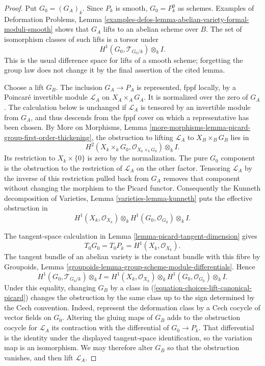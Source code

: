 \begin{proof}
Put $G_0 = (G_A)_k$. Since $P_k$ is smooth, $G_0=P_k^0$ as schemes. Examples
of Deformation Problems, Lemma
\ref{examples-defos-lemma-abelian-variety-formal-moduli-smooth} shows that
$G_A$ lifts to an abelian scheme over $B$. The set of isomorphism classes of
such lifts is a torsor under
\begin{equation}
\label{equation-choices-lift-canonical-picard}
H^1(G_0, \mathcal{T}_{G_0/k}) \otimes_k I.
\end{equation}
This is the usual difference space for lifts of a smooth scheme; forgetting
the group law does not change it by the final assertion of the cited lemma.

Choose a lift $G_B$. The inclusion $G_A \to P_A$ is represented, fppf locally,
by a Poincar\'e invertible module $\mathcal{L}_A$ on $X_A \times_A G_A$.
It is normalized over the zero of $G_A$. The calculation below is unchanged
if $\mathcal{L}_A$ is tensored by an invertible module from $G_A$, and thus
descends from the fppf cover on which a representative has been chosen. By
More on Morphisms, Lemma
\ref{more-morphisms-lemma-picard-group-first-order-thickening}, the obstruction
to lifting $\mathcal{L}_A$ to $X_B \times_B G_B$ lies in
$$
H^2(X_k \times_k G_0, \mathcal{O}_{X_k \times_k G_0}) \otimes_k I.
$$
Its restriction to $X_k \times \{0\}$ is zero by the normalization. The pure
$G_0$ component is the obstruction to the restriction of $\mathcal{L}_A$ on
the other factor. Tensoring $\mathcal{L}_A$ by the inverse of this restriction
pulled back from $G_A$ removes that component without changing the morphism to
the Picard functor. Consequently the Kunneth decomposition of Varieties, Lemma
\ref{varieties-lemma-kunneth} puts the effective obstruction in
\begin{equation}
\label{equation-obstruction-lift-poincare}
H^1(X_k, \mathcal{O}_{X_k}) \otimes_k
H^1(G_0, \mathcal{O}_{G_0}) \otimes_k I.
\end{equation}

The tangent-space calculation in Lemma
\ref{lemma-picard-tangent-dimension} gives
$$
T_0G_0 = T_0P_k = H^1(X_k, \mathcal{O}_{X_k}).
$$
The tangent bundle of an abelian variety is the constant bundle with this
fibre by Groupoids, Lemma
\ref{groupoids-lemma-group-scheme-module-differentials}. Hence
\begin{equation}
\label{equation-obstruction-equals-deformation-space}
H^1(G_0, \mathcal{T}_{G_0/k}) \otimes_k I
=
H^1(X_k, \mathcal{O}_{X_k}) \otimes_k
H^1(G_0, \mathcal{O}_{G_0}) \otimes_k I.
\end{equation}
Under this equality, changing $G_B$ by a class in
(\ref{equation-choices-lift-canonical-picard}) changes the obstruction by the
same class up to the sign determined by the Cech convention. Indeed, represent
the deformation class by a Cech cocycle of vector fields on $G_0$. Altering
the gluing maps of $G_B$ adds to the obstruction cocycle for $\mathcal{L}_A$
its contraction with the differential of $G_0 \to P_k$. That differential is
the identity under the displayed tangent-space identification, so the
variation map is an isomorphism. We may therefore alter $G_B$ so that the
obstruction vanishes, and then lift $\mathcal{L}_A$.


\end{proof}
